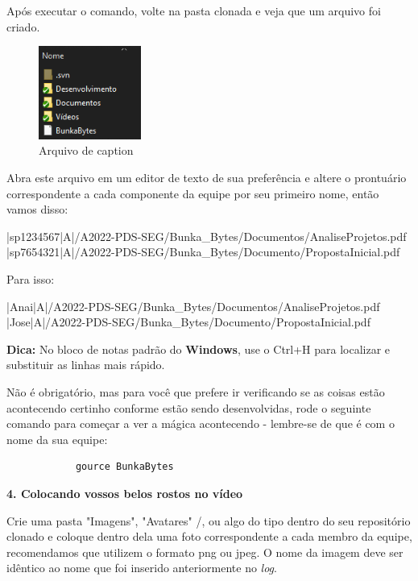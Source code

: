 Após executar o comando, volte na pasta clonada e veja que um arquivo foi criado.

\begin{figure}[htb]
        \centering
        \caption{Arquivo de caption}
        \includegraphics[width=0.3\textwidth]{anexos/Imagens_Blog/arquivo_log.png}
        \end{figure}
        \FloatBarrier

Abra este arquivo em um editor de texto de sua preferência e altere o prontuário correspondente a cada componente da equipe por seu primeiro nome, então vamos disso:

|sp1234567|A|/A2022-PDS-SEG/Bunka\_Bytes/Documentos/AnaliseProjetos.pdf \\
|sp7654321|A|/A2022-PDS-SEG/Bunka\_Bytes/Documento/PropostaInicial.pdf

Para isso:

|Anai|A|/A2022-PDS-SEG/Bunka\_Bytes/Documentos/AnaliseProjetos.pdf \\
|Jose|A|/A2022-PDS-SEG/Bunka\_Bytes/Documento/PropostaInicial.pdf

\textbf{Dica:} No bloco de notas padrão do \textbf{Windows}, use o Ctrl+H para localizar e substituir as linhas mais rápido.

Não é obrigatório, mas para você que prefere ir verificando se as coisas estão acontecendo certinho conforme estão sendo desenvolvidas, rode o seguinte comando para começar a ver a mágica acontecendo - lembre-se de que é com o nome da sua equipe:

\lstset{language=Fortran,
             basicstyle=\ttfamily\small,
             showstringspaces=false
    }
        \begin{lstlisting} 
            gource BunkaBytes
        \end{lstlisting}
        
\textbf{4. Colocando vossos belos rostos no vídeo}

Crie uma pasta "Imagens", "Avatares" /, ou algo do tipo dentro do seu repositório clonado e coloque dentro dela uma foto correspondente a cada membro da equipe, recomendamos que utilizem o formato png ou jpeg. O nome da imagem deve ser idêntico ao nome que foi inserido anteriormente no \textit{log}. 

